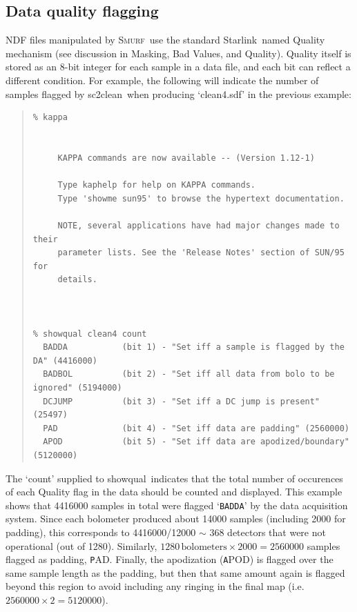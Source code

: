 \documentclass[twoside,11pt]{article}
\newenvironment{myquote}{\begin{quote}\begin{small}}{\end{small}\end{quote}}
\newcommand{\starlink}{\htmladdnormallink{Starlink}{http://starlink.jach.hawaii.edu}}
\newcommand{\smurf}{\xref{\textsc{Smurf}}{sun258}{}}
\newcommand{\task}[1]{\textsf{#1}}
\newcommand{\clean}{\xref{\task{sc2clean}}{sun258}{SC2CLEAN}}
\newcommand{\showqual}{\xref{\task{showqual}}{sun95}{SHOWQUAL}}
\newcommand{\htmladdnormallink}[2]{#1}
\newcommand{\xref}[3]{#1}
\newcommand{\xlabel}[1]{}
\renewcommand{\_}{\texttt{\symbol{95}}}
\begin{document}
\subsection{\xlabel{quality}Data quality flagging}

NDF files manipulated by \smurf\ use the standard \starlink\ named
Quality mechanism (see discussion in \xref{Masking, Bad Values, and
  Quality}{sun95}{se_masking}). Quality itself is stored as an 8-bit
integer for each sample in a data file, and each bit can reflect a
different condition. For example, the following will indicate the
number of samples flagged by \clean\ when producing `clean4.sdf' in
the previous example:

\begin{myquote}
\begin{verbatim}
% kappa


     KAPPA commands are now available -- (Version 1.12-1)

     Type kaphelp for help on KAPPA commands.
     Type 'showme sun95' to browse the hypertext documentation.

     NOTE, several applications have had major changes made to their
     parameter lists. See the 'Release Notes' section of SUN/95 for
     details.



% showqual clean4 count
  BADDA           (bit 1) - "Set iff a sample is flagged by the DA" (4416000)
  BADBOL          (bit 2) - "Set iff all data from bolo to be ignored" (5194000)
  DCJUMP          (bit 3) - "Set iff a DC jump is present" (25497)
  PAD             (bit 4) - "Set iff data are padding" (2560000)
  APOD            (bit 5) - "Set iff data are apodized/boundary" (5120000)
\end{verbatim}
\end{myquote}

The `count' supplied to \showqual\ indicates that the total number of
occurences of each Quality flag in the data should be counted and
displayed.  This example shows that 4416000 samples in total were
flagged `\texttt{BADDA}' by the data acquisition system. Since each
bolometer produced about 14000 samples (including 2000 for padding),
this corresponds to 4416000/12000 $\sim$ 368 detectors that were not
operational (out of 1280). Similarly, $1280 \,\mathrm{bolometers} \times 2000 =
2560000$ samples flagged as padding, {\texttt PAD}. Finally, the
apodization ({\texttt APOD}) is flagged over the same sample length as
the padding, but then that same amount again is flagged beyond this
region to avoid including any ringing in the final map (i.e. $2560000
\times 2 = 5120000$).
\end{document}
